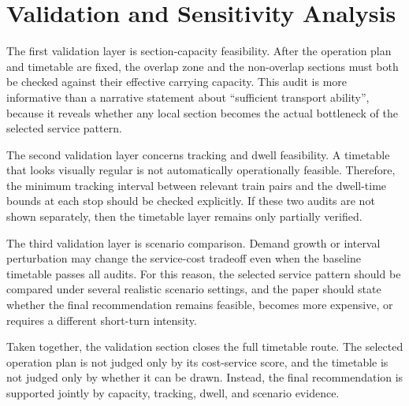 \section{Validation and Sensitivity Analysis}

The first validation layer is section-capacity feasibility. After the operation plan and timetable are fixed, the overlap zone and the non-overlap sections must both be checked against their effective carrying capacity. This audit is more informative than a narrative statement about “sufficient transport ability”, because it reveals whether any local section becomes the actual bottleneck of the selected service pattern.

The second validation layer concerns tracking and dwell feasibility. A timetable that looks visually regular is not automatically operationally feasible. Therefore, the minimum tracking interval between relevant train pairs and the dwell-time bounds at each stop should be checked explicitly. If these two audits are not shown separately, then the timetable layer remains only partially verified.

The third validation layer is scenario comparison. Demand growth or interval perturbation may change the service-cost tradeoff even when the baseline timetable passes all audits. For this reason, the selected service pattern should be compared under several realistic scenario settings, and the paper should state whether the final recommendation remains feasible, becomes more expensive, or requires a different short-turn intensity.

Taken together, the validation section closes the full timetable route. The selected operation plan is not judged only by its cost-service score, and the timetable is not judged only by whether it can be drawn. Instead, the final recommendation is supported jointly by capacity, tracking, dwell, and scenario evidence.
